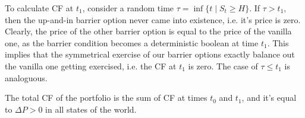 \documentclass[12pt]{article}
\theoremstyle{remark}
\begin{document}
To calculate CF at $t_1$, consider a random time $\tau=\inf\{t\;|\; S_t\ge H\}.$
If $\tau>t_1$, then the up-and-in barrier option never came into existence, i.e. it's price is zero. 
Clearly, the price of the other barrier option is equal to the price of the vanilla one, as the barrier condition becomes a deterministic boolean at time $t_1$. 
This implies that the symmetrical exercise of our barrier options exactly balance out the vanilla one getting exercised, i.e. the CF at $t_1$ is zero.
The case of $\tau\le t_1$ is analoguous. 

The total CF of the portfolio is the sum of CF at times $t_0$ and $t_1$, and it's equal to $\Delta P>0$ in all states of the world.
\end{document}
